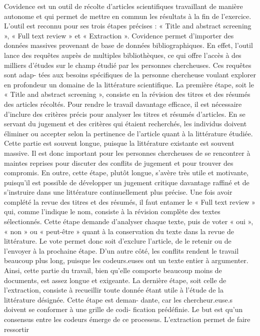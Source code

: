 \documentclass[
  letterpaper,
]{scrbook}
\begin{document}
Covidence est un outil de récolte d'articles scientifiques travaillant
de manière autonome et qui permet de mettre en commun les résultats à la
fin de l'exercice. L'outil est reconnu pour ses trois étapes précises :
« Title and abstract screening », « Full text review » et « Extraction
». Covidence permet d'importer des données massives provenant de base de
données bibliographiques. En effet, l'outil lance des requêtes auprès de
multiples bibliothèques, ce qui offre l'accès à des milliers d'études
sur le champ étudié par les personnes chercheuses. Ces requêtes sont
adap- tées aux besoins spécifiques de la personne chercheuse voulant
explorer en profondeur un domaine de la littérature scientifique. La
première étape, soit le « Title and abstract screening », consiste en la
révision des titres et des résumés des articles récoltés. Pour rendre le
travail davantage eﬀicace, il est nécessaire d'inclure des critères
précis pour analyser les titres et résumés d'articles. En se servant du
jugement et des critères qui étaient recherchés, les individus doivent
éliminer ou accepter selon la pertinence de l'article quant à la
littérature étudiée. Cette partie est souvent longue, puisque la
littérature existante est souvent massive. Il est donc important pour
les personnes chercheuses de se rencontrer à maintes reprises pour
discuter des conflits de jugement et pour trouver des compromis. En
outre, cette étape, plutôt longue, s'avère très utile et motivante,
puisqu'il est possible de développer un jugement critique davantage
raﬀiné et de s'instruire dans une littérature continuellement plus
précise. Une fois avoir complété la revue des titres et des résumés, il
faut entamer le « Full text review » qui, comme l'indique le nom,
consiste à la révision complète des textes sélectionnés. Cette étape
demande d'analyser chaque texte, puis de voter « oui », « non » ou «
peut-être » quant à la conservation du texte dans la revue de
littérature. Le vote permet donc soit d'exclure l'article, de le retenir
ou de l'envoyer à la prochaine étape. D'un autre côté, les conflits
rendent le travail beaucoup plus long, puisque les codeurs.euses ont un
texte entier à argumenter. Ainsi, cette partie du travail, bien qu'elle
comporte beaucoup moins de documents, est assez longue et exigeante. La
dernière étape, soit celle de l'extraction, consiste à recueillir toute
donnée étant utile à l'étude de la littérature désignée. Cette étape est
deman- dante, car les chercheur.euse.s doivent se conformer à une grille
de codi- fication prédéfinie. Le but est qu'un consensus entre les
codeurs émerge de ce processus. L'extraction permet de faire ressortir
\end{document}
